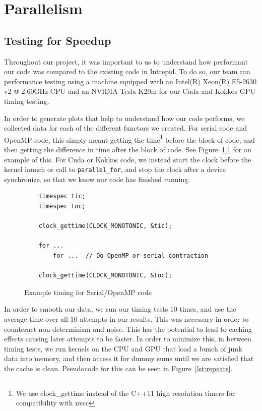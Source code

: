 \chapter{Parallelism}

\section{Testing for Speedup}

Throughout our project, it was important to us to understand how performant our
code was compared to the existing code in Intrepid.  To do so, our team ran
performance testing using a machine equipped with an Intel(R) Xeon(R) E5-2630 v2
@ 2.60GHz CPU and an NVIDIA Tesla K20m for our Cuda and Kokkos GPU timing
testing. 

In order to generate plots that help to understand how our code performs, we
collected data for each of the different functors we created.  For serial code
and OpenMP code, this simply meant getting the time\footnote{We use
clock\_gettime instead of the C++11 high resolution timers for compatibility with
nvcc} before the block of code, and then getting the difference in time after
the block of code. See Figure~\ref{lst:OMPTiming} for an example of this. For
Cuda or Kokkos code, we instead start the clock before the kernel launch or call
to \texttt{parallel\_for}, and stop the clock after a device synchronize, so
that we know our code has finished running.

\begin{figure}[ht]
    \begin{lstlisting}
    timespec tic;
    timespec toc;
    
    clock_gettime(CLOCK_MONOTONIC, &tic);
    
    for ...
    	for ...  // Do OpenMP or serial contraction
    
    clock_gettime(CLOCK_MONOTONIC, &toc);
 \end{lstlisting}
\caption{Example timing for Serial/OpenMP code}
\label{lst:OMPTiming}
\end{figure}

In order to smooth our data, we run our timing tests 10 times, and use the
average time over all 10 attempts in our results. This was necessary in order to
counteract non-determinism and noise. This has the potential to lead to caching
effects causing later attempts to be faster. In order to minimize this, in
between timing tests, we run kernels on the CPU and GPU that load a bunch of
junk data into memory, and then access it for dummy sums until we are satisfied
that the cache is clean.  Pseudocode for this can be seen in
Figure~\ref{lst:repeats}.

